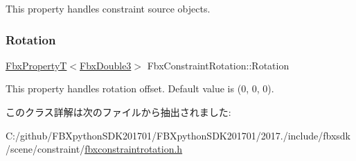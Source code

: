 This property handles constraint source objects. \mbox{\label{class_fbx_constraint_rotation_aa0bb0aa79b3f983ede4a376f12adb1c9}} 
\subsubsection{\texorpdfstring{Rotation}{Rotation}}
{\footnotesize\ttfamily \hyperlink{class_fbx_property_t}{Fbx\+PropertyT}$<$\hyperlink{fbxtypes_8h_ae0a96f14cde566774c7553aa7523b7a7}{Fbx\+Double3}$>$ Fbx\+Constraint\+Rotation\+::\+Rotation}

This property handles rotation offset. Default value is (0, 0, 0). 

このクラス詳解は次のファイルから抽出されました\+:\begin{DoxyCompactItemize}
\item 
C\+:/github/\+F\+B\+Xpython\+S\+D\+K201701/\+F\+B\+Xpython\+S\+D\+K201701/2017./include/fbxsdk/scene/constraint/\hyperlink{fbxconstraintrotation_8h}{fbxconstraintrotation.\+h}\end{DoxyCompactItemize}
